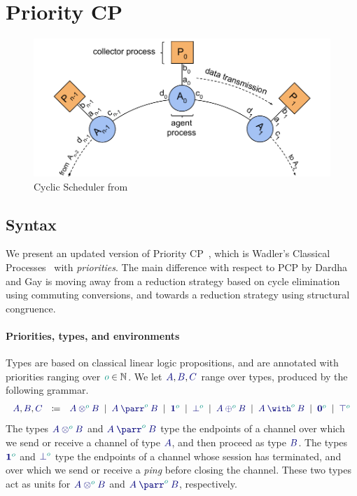 \documentclass[main.tex]{subfiles}
\begin{document}
\section{Priority CP}

\begin{figure}[t]
  \centering
  \includegraphics[width=0.8\columnwidth]{scheduler}
  \vspace{-4mm}
  \caption{Cyclic Scheduler from \cite{dardhagay18}}
  \label{fig:scheduler}
  \vspace{-4mm}
  \end{figure}

\subsection{Syntax}

We present an updated version of Priority CP~\cite[PCP]{dardhagay18}, which is Wadler's Classical Processes~\cite[CP]{wadler12} with \emph{priorities}.
The main difference with respect to PCP by Dardha and Gay \cite{dardhagay18} is moving away from a reduction strategy based on cycle elimination using commuting conversions, and towards a reduction strategy using structural congruence.

\paragraph*{Priorities, types, and environments}
Types are based on classical linear logic propositions, and are annotated with priorities ranging over $\cs{o}\in\mathbb{N}$. We let $\ty{A}, \ty{B}, \ty{C}$ range over types, produced by the following grammar.
\[
\begin{array}{lcl}
  \ty{A}, \ty{B}, \ty{C}
  & \coloneqq & \ty{\tytens[\cs{o}]{A}{B}}
    \sep        \ty{\typarr[\cs{o}]{A}{B}}
    \sep        \ty{\tyone[\cs{o}]}
    \sep        \ty{\tybot[\cs{o}]}
    \sep        \ty{\typlus[\cs{o}]{A}{B}}
    \sep        \ty{\tywith[\cs{o}]{A}{B}}
    \sep        \ty{\tynil[\cs{o}]}
    \sep        \ty{\tytop[\cs{o}]}
\end{array}
\]
The types $\ty{\tytens[\cs{o}]{A}{B}}$ and $\ty{\typarr[\cs{o}]{A}{B}}$ type the endpoints of a channel over which we send or receive a channel of type $\ty{A}$, and then proceed as type $\ty{B}$.
The types $\ty{\tyone[\cs{o}]}$ and $\ty{\tybot[\cs{o}]}$ type the endpoints of a channel whose session has terminated, and over which we send or receive a \emph{ping} before closing the channel. These two types act as units for $\ty{\tytens[\cs{o}]{A}{B}}$ and $\ty{\typarr[\cs{o}]{A}{B}}$, respectively.
\end{document}
